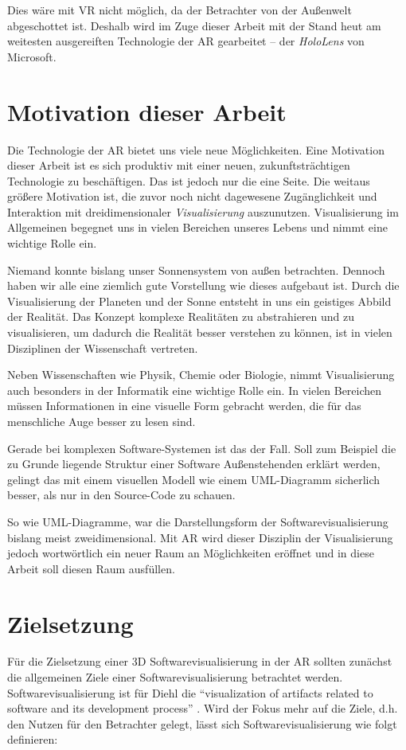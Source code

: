 Dies wäre mit VR nicht möglich, da der Betrachter von der Außenwelt abgeschottet ist. Deshalb wird im Zuge dieser Arbeit mit der Stand heut am weitesten ausgereiften Technologie der AR gearbeitet -- der \emph{HoloLens} von Microsoft.

\section{Motivation dieser Arbeit}
Die Technologie der AR bietet uns viele neue Möglichkeiten. Eine Motivation dieser Arbeit ist es sich produktiv mit einer neuen, zukunftsträchtigen Technologie zu beschäftigen. Das ist jedoch nur die eine Seite. Die weitaus größere Motivation ist, die zuvor noch nicht dagewesene Zugänglichkeit und Interaktion mit dreidimensionaler \emph{Visualisierung} auszunutzen. Visualisierung im Allgemeinen begegnet uns in vielen Bereichen unseres Lebens und nimmt eine wichtige Rolle ein.

Niemand konnte bislang unser Sonnensystem von außen betrachten. Dennoch haben wir alle eine ziemlich gute Vorstellung wie dieses aufgebaut ist. Durch die Visualisierung der Planeten und der Sonne entsteht in uns ein geistiges Abbild der Realität. Das Konzept komplexe Realitäten zu abstrahieren und zu visualisieren, um dadurch die Realität besser verstehen zu können, ist in vielen Disziplinen der Wissenschaft vertreten.

Neben Wissenschaften wie Physik, Chemie oder Biologie, nimmt Visualisierung
auch besonders in der Informatik eine wichtige Rolle ein. In vielen Bereichen müssen Informationen in eine visuelle Form gebracht werden, die für das menschliche Auge besser zu lesen sind.

Gerade bei komplexen Software-Systemen ist das der Fall. Soll zum Beispiel die zu Grunde liegende Struktur einer Software Außenstehenden erklärt werden, gelingt das mit einem visuellen Modell wie einem UML-Diagramm sicherlich besser, als nur in den Source-Code zu schauen.

So wie UML-Diagramme, war die Darstellungsform der Softwarevisualisierung bislang meist zweidimensional. Mit AR wird dieser Disziplin der Visualisierung jedoch wortwörtlich ein neuer Raum an Möglichkeiten eröffnet und in diese Arbeit soll diesen Raum ausfüllen.

\section{Zielsetzung}
Für die Zielsetzung einer 3D Softwarevisualisierung in der AR sollten zunächst die allgemeinen Ziele einer Softwarevisualisierung betrachtet werden. Softwarevisualisierung ist für Diehl die "`visualization of artifacts related to software and its development process"' \cite{diehl2007software}. Wird der Fokus mehr auf die Ziele, d.h. den Nutzen für den Betrachter gelegt, lässt sich Softwarevisualisierung wie folgt definieren:


